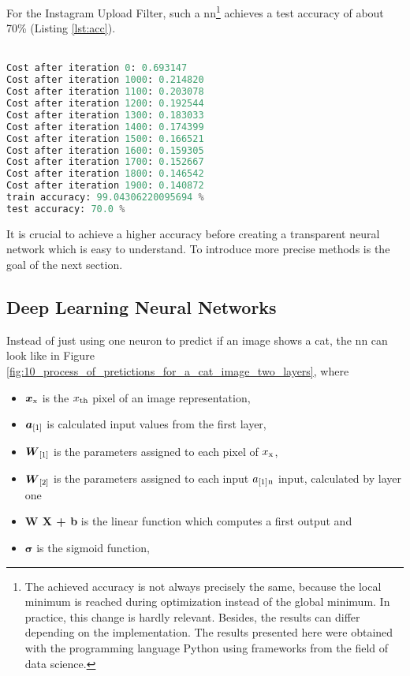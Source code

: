 For the Instagram Upload Filter, such a \Gls{nn}\footnote{The achieved accuracy is not always precisely the same, because the local minimum is reached during optimization instead of the global minimum. In practice, this change is hardly relevant. Besides, the results can differ depending on the implementation. The results presented here were obtained with the programming language Python using frameworks from the field of data science.} achieves a test accuracy of about 70\% (Listing \ref{lst:acc}).\\\\

\begin{lstlisting}[captionpos=b,label={lst:acc},language=Python, caption=Test accuracy is 70\% after iteration 2000 times and using 209 examples with 12287 features (\(64\times64 \) pixels). This is not state of the art but very good if considering that this is a linear classifier on a high dimensional feature space.]
Cost after iteration 0: 0.693147
Cost after iteration 1000: 0.214820
Cost after iteration 1100: 0.203078
Cost after iteration 1200: 0.192544
Cost after iteration 1300: 0.183033
Cost after iteration 1400: 0.174399
Cost after iteration 1500: 0.166521
Cost after iteration 1600: 0.159305
Cost after iteration 1700: 0.152667
Cost after iteration 1800: 0.146542
Cost after iteration 1900: 0.140872
train accuracy: 99.04306220095694 %
test accuracy: 70.0 %
\end{lstlisting}

It is crucial to achieve a higher accuracy before creating a transparent neural network which is easy to understand. To introduce more precise methods is the goal of the next section.

\subsection{Deep Learning Neural Networks}
\label{subsec:deep_learning}
Instead of just using one neuron to predict if an image shows a cat, the \Gls{nn} can look like in Figure \ref{fig:10_process_of_pretictions_for_a_cat_image_two_layers}, where

\begin{itemize}
	\item \(\boldsymbol{x\textsubscript{x}}\) is the \(x\textsubscript{th}\) pixel of an image representation,
	\item \(\boldsymbol{a\textsubscript{[1]}}\) is calculated input values from the first layer,
	\item \(\boldsymbol{W\textsubscript{[1]}}\) is the parameters assigned to each pixel of \( x\textsubscript{x}\),
	\item \(\boldsymbol{W\textsubscript{[2]}}\) is the parameters assigned to each input  \(a\textsubscript{[1]}\textsubscript{n}\) input, calculated by layer one
	\item \textbf{W X + b} is the linear function which computes a first output and
	\item \(\boldsymbol{\sigma}\) is the sigmoid function,
\end{itemize}

